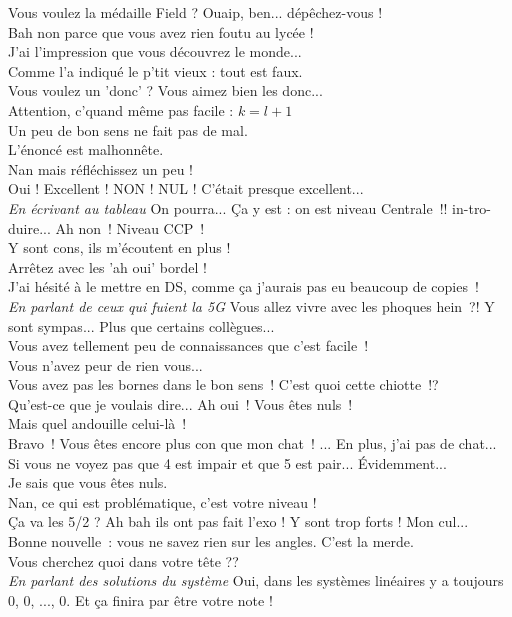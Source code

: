 \documentclass[french, a4paper, openany]{book}
\begin{document}
	\noindent \og Vous voulez la médaille Field ? Ouaip, ben... dépêchez-vous ! \fg \\
	\og Bah non parce que vous avez rien foutu au lycée ! \fg \\
	\og J'ai l'impression que vous découvrez le monde... \fg \\
	\og Comme l'a indiqué le p'tit vieux : tout est faux. \fg \\
	\og Vous voulez un 'donc' ? Vous aimez bien les donc... \fg \\
	\og Attention, c'quand même pas facile : $k = l+ 1$ \fg \\
	\og Un peu de bon sens ne fait pas de mal. \fg \\
	\og L'énoncé est malhonnête. \fg \\
	\og Nan mais réfléchissez un peu ! \fg \\
	\og Oui ! Excellent ! NON ! NUL ! C'était presque excellent... \fg \\
	\emph{En écrivant au tableau} \og On pourra... Ça y est : on est niveau Centrale~!! in-tro-duire... Ah non~! Niveau CCP~! \fg \\
	\og Y sont cons, ils m'écoutent en plus ! \fg \\
	\og Arrêtez avec les 'ah oui' bordel ! \fg \\
	\og J'ai hésité à le mettre en DS, comme ça j'aurais pas eu beaucoup de copies~!\fg \\
	\emph{En parlant de ceux qui fuient la 5G} \og Vous allez vivre avec les phoques hein~?! Y sont sympas... Plus que certains collègues... \fg \\
	\og Vous avez tellement peu de connaissances que c'est facile~! \fg \\
	\og Vous n'avez peur de rien vous... \fg \\	
	\og Vous avez pas les bornes dans le bon sens~! C'est quoi cette chiotte~!? \fg \\
	\og Qu'est-ce que je voulais dire... Ah oui~! Vous êtes nuls~! \fg \\
	\og Mais quel andouille celui-là~! \fg \\
	\og Bravo~! Vous êtes encore plus con que mon chat~! ... En plus, j'ai pas de chat... \fg \\
	\og Si vous ne voyez pas que 4 est impair et que 5 est pair... Évidemment... \fg \\
	\og Je sais que vous êtes nuls. \fg \\
	\og Nan, ce qui est problématique, c'est votre niveau ! \fg \\
	\og Ça va les 5/2 ? Ah bah ils ont pas fait l'exo ! Y sont trop forts ! Mon cul... \fg \\
	\og Bonne nouvelle~: vous ne savez rien sur les angles. C'est la merde. \fg \\
	\og Vous cherchez quoi dans votre tête ?? \fg \\
	\emph{En parlant des solutions du système} \og Oui, dans les systèmes linéaires y a toujours 0, 0, ..., 0. Et ça finira par être votre note ! \fg \\
	
\end{document}
